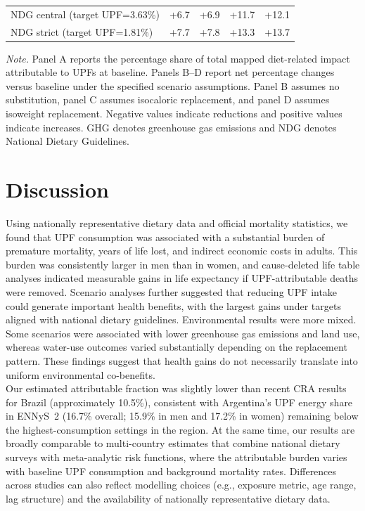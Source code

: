 \documentclass{article}
\newcommand{\tabnote}[1]{%
  \vspace{0.06cm}%
  {\footnotesize\setstretch{1}\par\raggedright\textit{Note.} #1\par}%
}
\begin{document}
{\begin{longtable}[]{@{}lrrrr@{}}
NDG central (target UPF=3.63\%) & +6.7 & +6.9 & +11.7 & +12.1 \\
NDG strict (target UPF=1.81\%) & +7.7 & +7.8 & +13.3 & +13.7 \\
\end{longtable}
\tabnote{Panel A reports the percentage share of total mapped diet-related impact attributable to UPFs at baseline. Panels B--D report net percentage changes versus baseline under the specified scenario assumptions. Panel B assumes no substitution, panel C assumes isocaloric replacement, and panel D assumes isoweight replacement. Negative values indicate reductions and positive values indicate increases. GHG denotes greenhouse gas emissions and NDG denotes National Dietary Guidelines.}
}

\section{Discussion}\label{discussion}

Using nationally representative dietary data and official mortality statistics, we found that UPF consumption was associated with a substantial burden of premature mortality, years of life lost, and indirect economic costs in adults. This burden was consistently larger in men than in women, and cause-deleted life table analyses indicated measurable gains in life expectancy if UPF-attributable deaths were removed. Scenario analyses further suggested that reducing UPF intake could generate important health benefits, with the largest gains under targets aligned with national dietary guidelines. Environmental results were more mixed. Some scenarios were associated with lower greenhouse gas emissions and land use, whereas water-use outcomes varied substantially depending on the replacement pattern. These findings suggest that health gains do not necessarily translate into uniform environmental co-benefits. \\

Our estimated attributable fraction was slightly lower than recent CRA results for Brazil (approximately 10.5\%),\cite{Nilson2023} consistent with Argentina's UPF energy share in ENNyS~2 (16.7\% overall; 15.9\% in men and 17.2\% in women) remaining below the highest-consumption settings in the region. At the same time, our results are broadly comparable to multi-country estimates that combine national dietary surveys with meta-analytic risk functions, where the attributable burden varies with baseline UPF consumption and background mortality rates.\cite{Nilson2025} Differences across studies can also reflect modelling choices (e.g., exposure metric, age range, lag structure) and the availability of nationally representative dietary data. \\
\end{document}
